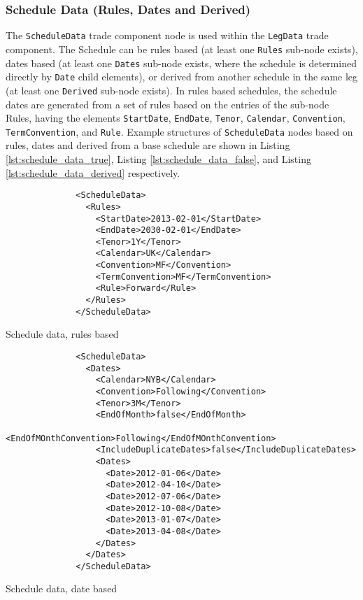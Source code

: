 \subsubsection{Schedule Data (Rules, Dates and Derived)}\label{ss:schedule_data}

The \lstinline!ScheduleData! trade component node is used within the \lstinline!LegData! trade component. The Schedule can be
rules based (at least one \lstinline!Rules! sub-node exists), dates based (at least one \lstinline!Dates! sub-node exists, where
the schedule is determined directly by \lstinline!Date! child elements), or derived from another schedule in the same leg
(at least one \lstinline!Derived! sub-node exists). In rules based schedules, the schedule dates are generated from a
set of rules based on the entries of the sub-node Rules, having the elements \lstinline!StartDate!, \lstinline!EndDate!, 
\lstinline!Tenor!, \lstinline!Calendar!, \lstinline!Convention!, \lstinline!TermConvention!, and \lstinline!Rule!.
Example structures of \lstinline!ScheduleData! nodes based on rules, dates and derived from a base schedule are shown in
Listing \ref{lst:schedule_data_true}, Listing \ref{lst:schedule_data_false}, and Listing \ref{lst:schedule_data_derived}
respectively.

\begin{listing}[H]
\begin{verbatim}
              <ScheduleData>
                <Rules>
                  <StartDate>2013-02-01</StartDate>
                  <EndDate>2030-02-01</EndDate>
                  <Tenor>1Y</Tenor>
                  <Calendar>UK</Calendar>
                  <Convention>MF</Convention>
                  <TermConvention>MF</TermConvention>
                  <Rule>Forward</Rule>
                </Rules>
              </ScheduleData>
\end{verbatim}
\caption{Schedule data, rules based}
\label{lst:schedule_data_true}
\end{listing}

\begin{listing}[H]
\begin{verbatim}
              <ScheduleData>
                <Dates>
                  <Calendar>NYB</Calendar>
                  <Convention>Following</Convention>
                  <Tenor>3M</Tenor>
                  <EndOfMonth>false</EndOfMonth>
                  <EndOfMOnthConvention>Following</EndOfMOnthConvention>
                  <IncludeDuplicateDates>false</IncludeDuplicateDates>
                  <Dates>
                    <Date>2012-01-06</Date>
                    <Date>2012-04-10</Date>
                    <Date>2012-07-06</Date>
                    <Date>2012-10-08</Date>
                    <Date>2013-01-07</Date>
                    <Date>2013-04-08</Date>
                  </Dates>
                </Dates> 
              </ScheduleData>
\end{verbatim}
\caption{Schedule data, date based}
\label{lst:schedule_data_false}
\end{listing}

